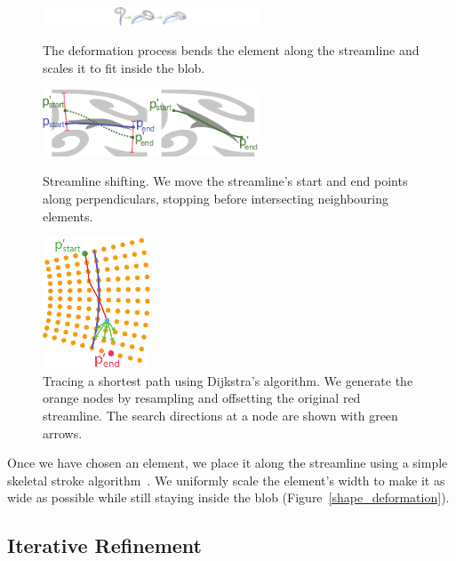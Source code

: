 \begin{figure}
\centering
\includegraphics[width=6.4cm]{figures/flowpak/shape_deformation.pdf}
\caption[Shape deformation]
{\label{shape_deformation}
The deformation process bends the element along the streamline and
scales it to fit inside the blob.}
\bigskip
 \includegraphics[width=6.4cm]{figures/flowpak/shift_streamline.pdf}
 \caption[Shift a streamline]
 {\label{shift_streamline}
 Streamline shifting.
 	We move the streamline's start and end points along 
	perpendiculars, stopping before intersecting neighbouring elements.}
\smallskip
\includegraphics[width=3.2cm]{figures/flowpak/dijkstra.pdf}
 \caption[Trace a shortest path]
 {\label{dijkstra}
 Tracing a shortest path using Dijkstra's algorithm.  We generate the 
 orange nodes by resampling and offsetting the original red streamline.
          The search directions at a node are shown with green arrows.}
\end{figure}

Once we have chosen an element, we place it along the streamline using a
simple skeletal stroke algorithm~\cite{Hsu93}. We uniformly scale the element's width
to make it as wide as possible while still staying inside the blob
(Figure~\ref{shape_deformation}).

\subsection{Iterative Refinement}


